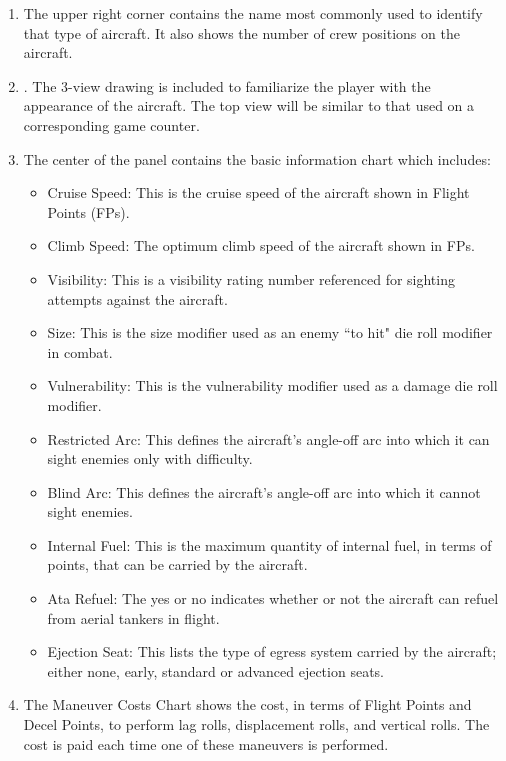 \begin{enumerate}

    \item {} The upper right corner contains the name most commonly used to identify that type of aircraft. It also shows the number of crew positions on the aircraft.

    \item {}. The 3-view drawing is included to familiarize the player with the appearance of the aircraft. The top view will be similar to that used on a corresponding game counter.

    \item {} The center of the panel contains the basic information chart which includes:
    \begin{itemize}
        \item Cruise Speed: This is the cruise speed of the aircraft shown in Flight Points (FPs).
        \item Climb Speed: The optimum climb speed of the aircraft shown in FPs.
        \item Visibility: This is a visibility rating number referenced for sighting attempts against the aircraft.
        \item Size: This is the size modifier used as an enemy “to hit" die roll modifier in combat.
        \item Vulnerability: This is the vulnerability modifier used as a damage die roll modifier.
        \item Restricted Arc: This defines the aircraft's angle-off arc into which it can sight enemies only with difficulty.
        \item Blind Arc: This defines the aircraft's angle-off arc into which it cannot sight enemies.
        \item Internal Fuel: This is the maximum quantity of internal fuel, in terms of points, that can be carried by the aircraft.
        \item Ata Refuel: The yes or no indicates whether or not the aircraft can refuel from aerial tankers in flight.
        \item Ejection Seat: This lists the type of egress system carried by the aircraft; either none, early, standard or advanced ejection seats.
    \end{itemize}

    \item {} The Maneuver Costs Chart shows the cost, in terms of Flight Points and Decel Points, to perform lag rolls, displacement rolls, and vertical rolls. The cost is paid each time one of these maneuvers is performed.


\end{enumerate}
